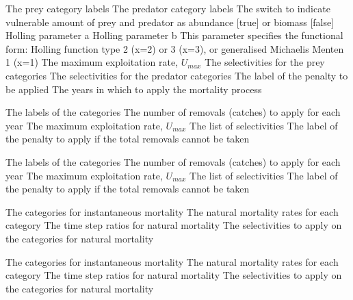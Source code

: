 \par\textbf{}\par
{} {The prey category labels}
 {The predator category labels}
 {The switch to indicate vulnerable amount of prey and predator as abundance [true] or biomass [false]}
 {Holling parameter a}
 {Holling parameter b}
 {This parameter specifies the functional form: Holling function type 2 (x=2) or 3 (x=3), or generalised Michaelis Menten 1 (x=1)}
 {The maximum exploitation rate, $U_{max}$}
 {The selectivities for the prey categories}
 {The selectivities for the predator categories}
 {The label of the penalty to be applied}
 {The years in which to apply the mortality process}

\par\textbf{}\par
{} {The labels of the categories}
 {The number of removals (catches) to apply for each year}
 {The maximum exploitation rate, $U_{max}$}
 {The list of selectivities}
 {The label of the penalty to apply if the total removals cannot be taken}

\par\textbf{}\par
{} {The labels of the categories}
 {The number of removals (catches) to apply for each year}
 {The maximum exploitation rate, $U_{max}$}
 {The list of selectivities}
 {The label of the penalty to apply if the total removals cannot be taken}

\par\textbf{}\par
{} {The categories for instantaneous mortality}
 {The natural mortality rates for each category}
 {The time step ratios for natural mortality}
 {The selectivities to apply on the categories for natural mortality}

\par\textbf{}\par
{} {The categories for instantaneous mortality}
 {The natural mortality rates for each category}
 {The time step ratios for natural mortality}
 {The selectivities to apply on the categories for natural mortality}

